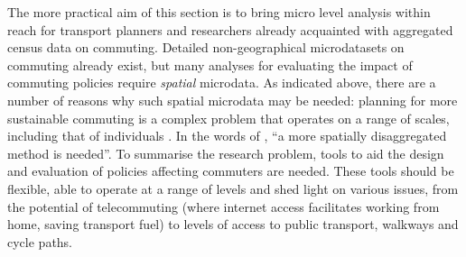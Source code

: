The more practical aim of this section is to bring micro level analysis
within reach for transport planners and
researchers already acquainted with aggregated census data on commuting.
Detailed non-geographical microdatasets on commuting already exist,
but many analyses for evaluating the
impact of commuting policies require \emph{spatial} microdata. As indicated
above, there are a number of  reasons why such spatial microdata may be
needed: planning for more sustainable commuting is a complex problem that
operates on a range of scales, including that of individuals
\citep{Vega2012, Verhetsel2010}. In the words of \citet[p.~313]{Li2012}, ``a more spatially
disaggregated method is needed''. To summarise the research problem,
tools to aid the design and evaluation of policies affecting commuters are needed.
These tools should be flexible, able to operate at a range of
levels and shed light on various issues, from the potential of telecommuting
(where internet access facilitates working from home, saving transport fuel)
to levels of access to public transport, walkways and cycle paths.

